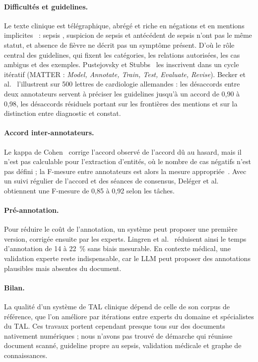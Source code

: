 \paragraph{Difficultés et guidelines.} Le texte clinique est télégraphique, abrégé et riche en négations et en mentions implicites~\cite{meystre2008extracting} : \og sepsis \fg{}, \og suspicion de sepsis \fg{} et \og antécédent de sepsis \fg{} n'ont pas le même statut, et \og absence de fièvre \fg{} ne décrit pas un symptôme présent. D'où le rôle central des guidelines, qui fixent les catégories, les relations autorisées, les cas ambigus et des exemples. Pustejovsky et Stubbs~\cite{pustejovsky2012natural} les inscrivent dans un cycle itératif (MATTER : \textit{Model, Annotate, Train, Test, Evaluate, Revise}). Becker et al.~\cite{becker2025cardio} l'illustrent sur 500 lettres de cardiologie allemandes : les désaccords entre deux annotateurs servent à préciser les guidelines jusqu'à un accord de 0,90 à 0,98, les désaccords résiduels portant sur les frontières des mentions et sur la distinction entre diagnostic et constat.

\paragraph{Accord inter-annotateurs.} Le kappa de Cohen~\cite{cohen1960} corrige l'accord observé de l'accord dû au hasard, mais il n'est pas calculable pour l'extraction d'entités, où le nombre de cas négatifs n'est pas défini ; la F-mesure entre annotateurs est alors la mesure appropriée~\cite{hripcsak2005agreement}. Avec un suivi régulier de l'accord et des séances de consensus, Deléger et al.~\cite{deleger2012building} obtiennent une F-mesure de 0,85 à 0,92 selon les tâches.

\paragraph{Pré-annotation.} Pour réduire le coût de l'annotation, un système peut proposer une première version, corrigée ensuite par les experts. Lingren et al.~\cite{lingren2014preannotation} réduisent ainsi le temps d'annotation de 14 à 22~\% sans biais mesurable. En contexte médical, une validation experte reste indispensable, car le LLM peut proposer des annotations plausibles mais absentes du document.

\paragraph{Bilan.} La qualité d'un système de TAL clinique dépend de celle de son corpus de référence, que l'on améliore par itérations entre experts du domaine et spécialistes du TAL. Ces travaux portent cependant presque tous sur des documents nativement numériques ; nous n'avons pas trouvé de démarche qui réunisse document scanné, guideline propre au sepsis, validation médicale et graphe de connaissances.

